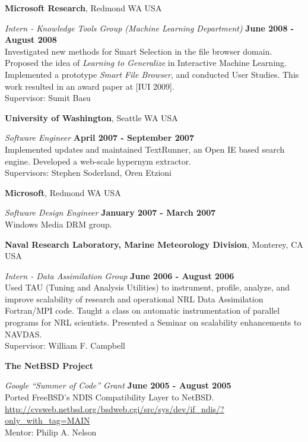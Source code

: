 \documentclass[margin,line]{res}
\begin{document}
\begin{resume}
{\bf Microsoft Research},
Redmond WA USA

\vspace{-.3cm}
{\em Intern - Knowledge Tools Group (Machine Learning Department)} \hfill {\bf June 2008 - August 2008}\\
Investigated new methods for Smart Selection in the file browser domain.  
Proposed the idea of {\em Learning to Generalize} in Interactive Machine
Learning.  Implemented a prototype {\em Smart File Browser}, and conducted User Studies.
This work resulted in an award paper at [IUI 2009].\\
Supervisor: Sumit Basu


{\bf University of Washington},
Seattle WA USA

\vspace{-.3cm}
{\em Software Engineer} \hfill {\bf April 2007 - September 2007}\\
Implemented updates and maintained {\sc TextRunner}, an Open IE based search
engine.  Developed a web-scale hypernym extractor.\\
Supervisors: Stephen Soderland, Oren Etzioni

{\bf Microsoft}, 
Redmond WA USA

\vspace{-.3cm}
{\em Software Design Engineer} \hfill {\bf January 2007 - March 2007}\\
Windows Media DRM group.

{\bf Naval Research Laboratory, Marine Meteorology Division},
Monterey, CA USA

\vspace{-.3cm}
{\em Intern - Data Assimilation Group} \hfill {\bf June 2006 - August 2006}\\
Used TAU (Tuning and Analysis Utilities) to instrument, profile, analyze,
and improve scalability of research and operational NRL Data Assimilation 
Fortran/MPI code.  Taught a class on automatic instrumentation of parallel 
programs for NRL scientists.  Presented a Seminar on scalability enhancements
to NAVDAS.\\
Supervisor: William F. Campbell

{\bf The NetBSD Project}

\vspace{-.3cm}
{\em Google ``Summer of Code'' Grant} \hfill {\bf June 2005 - August 2005}\\
Ported FreeBSD's NDIS Compatibility Layer to NetBSD. \\
\url{http://cvsweb.netbsd.org/bsdweb.cgi/src/sys/dev/if_ndis/?only_with_tag=MAIN} \\
Mentor: Philip A. Nelson


\end{resume}
\end{document}
